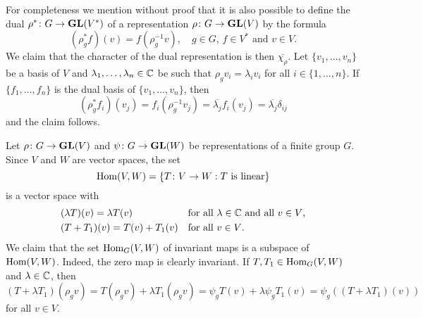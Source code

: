 For completeness we mention without proof that
it is also possible to define the dual $\rho^*\colon G\to\mathbf{GL}(V^*)$  
of a representation
$\rho\colon G\to\mathbf{GL}(V)$ by the formula
\[
(\rho^*_gf)(v)=f(\rho^{-1}_gv),\quad
g\in G,\,f\in V^*\text{ and }v\in V.
\]  
We claim that the character of the dual representation is then 
$\overline{\chi_\rho}$. Let $\{v_1,\dots,v_n\}$ be a basis of $V$
and $\lambda_1,\dots,\lambda_n\in\mathbb{C}$ be such that $\rho_gv_i=\lambda_iv_i$ for all $i\in\{1,\dots,n\}$. If $\{f_1,\dots,f_n\}$ is the dual basis of $\{v_1,\dots,v_n\}$, then 
\[
(\rho^*_gf_i)(v_j)=f_i(\rho_g^{-1}v_j)
=\overline{\lambda_j}f_i(v_j)
=\overline{\lambda_j}\delta_{ij}
\]
and the claim follows. 
%	
%
%	
%	  
%	

Let $\rho\colon G\to\mathbf{GL}(V)$ and $\psi\colon G\to\mathbf{GL}(W)$ be representations of a finite group
$G$. Since $V$ and $W$ are vector spaces, the set 
\[
\operatorname{Hom}(V,W)=\{T\colon V\to W:\text{$T$ is linear}\}
\]
is a vector space with 
\begin{align*}
&(\lambda T)(v)=\lambda T(v) && \text{for all $\lambda\in\mathbb{C}$ and all $v\in V$,}\\ 
&(T+T_1)(v)=T(v)+T_1(v) &&\text{for all $v\in V$.}
\end{align*}
We claim that the set $\operatorname{Hom}_G(V,W)$ of invariant maps
is a subspace of $\operatorname{Hom}(V,W)$. Indeed, the zero map is clearly invariant. If $T,T_1\in\operatorname{Hom}_G(V,W)$ 
and $\lambda\in\mathbb{C}$, then
\[
(T+\lambda T_1)(\rho_g v)
=T(\rho_gv)+\lambda T_1(\rho_gv)
=\psi_gT(v)+\lambda \psi_gT_1(v)
=\psi_g((T+\lambda T_1)(v))
\]
for all $v\in V$. 
 
